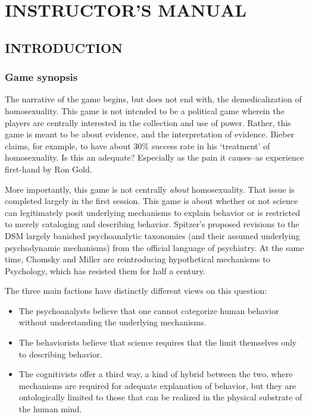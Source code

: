 \pagebreak 

\part{INSTRUCTOR'S MANUAL}
\label{instructorsmanual}

\pagebreak 

\chapter{INTRODUCTION}
\label{introduction}

\section{Game synopsis}
\label{gamesynopsis}

The narrative of the game begins, but does not end with, the demedicalization of homosexuality. This game is not intended to be a political game wherein the players are centrally interested in the collection and use of power. Rather, this game is meant to be about evidence, and the interpretation of evidence. Bieber claims, for example, to have about 30\% success rate in his `treatment' of homosexuality. Is this an adequate? Especially as the pain it causes--as experience first-hand by Ron Gold.

More importantly, this game is not centrally \emph{about} homosexuality. That issue is completed largely in the first session. This game is about whether or not science can legitimately posit underlying mechanisms to explain behavior or is restricted to merely cataloging and describing behavior. Spitzer's proposed revisions to the DSM largely banished psychoanalytic taxonomies (and their assumed underlying psychodynamic mechanisms) from the official language of psychiatry. At the same time, Chomsky and Miller are reintroducing hypothetical mechanisms to Psychology, which has resisted them for half a century.

The three main factions have distinctly different views on this question: 

\begin{itemize}
\item The psychoanalysts believe that one cannot categorize human behavior without understanding the underlying mechanisms. 

\item The behaviorists believe that science requires that the limit themselves only to describing behavior. 

\item The cognitivists offer a third way, a kind of hybrid between the two, where mechanisms are required for adequate explanation of behavior, but they are ontologically limited to those that can be realized in the physical substrate of the human mind.

\end{itemize}

